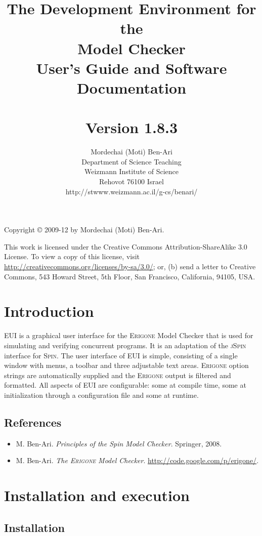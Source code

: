 \documentclass[11pt]{article}
\title{The \eui{} Development Environment for the\\
\eri{} Model Checker\\User's Guide and Software Documentation\\
\mbox{}\\\large{Version 1.8.3}}       %
\author{Mordechai (Moti) Ben-Ari\\
Department of Science Teaching\\
Weizmann Institute of Science\\
Rehovot 76100 Israel\\
\textsf{http://stwww.weizmann.ac.il/g-cs/benari/}}
\newcommand{\eri}{\textsc{Erigone}}
\newcommand{\eui}{\textsc{EUI}}
\begin{document}
\maketitle
\thispagestyle{empty}

\vfill

\begin{center}
Copyright \copyright{} 2009-12 by Mordechai (Moti) Ben-Ari.
\end{center}

This work is licensed under the Creative Commons Attribution-ShareAlike 3.0
License. To view a copy of this license, visit
\url{http://creativecommons.org/licenses/by-sa/3.0/}; or, (b) send a letter
to Creative Commons, 543 Howard Street, 5th Floor, San Francisco,
California, 94105, USA.

\newpage

\section{Introduction}

\eui{} is a graphical user interface for the \eri{} Model Checker that
is used for simulating and verifying concurrent programs. It is an
adaptation of the \textsc{jSpin} interface for \textsc{Spin}. The user
interface of \eui{} is simple, consisting of a single window with menus,
a toolbar and three adjustable text areas. \eri{} option strings are
automatically supplied and the \eri{} output is filtered and formatted.
All aspects of \eui{} are configurable: some at compile time, some at
initialization through a configuration file and some at runtime.

\subsection*{References}
\begin{itemize}
\item M. Ben-Ari. \textit{Principles of the Spin Model Checker}. Springer, 2008.
\item M. Ben-Ari. \textit{The \eri{} Model Checker}. \url{http://code.google.com/p/erigone/}.
\end{itemize}

\section{Installation and execution}

\subsection{Installation}
\end{document}
